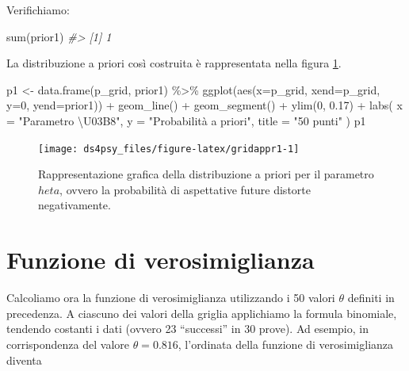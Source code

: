 \documentclass[
  11pt,
]{krantz}
\makeatletter
\newenvironment{Shaded}{\begin{snugshade}}{\end{snugshade}}
\newcommand{\AttributeTok}[1]{\textcolor[rgb]{0.61,0.61,0.61}{#1}}
\newcommand{\CommentTok}[1]{\textcolor[rgb]{0.37,0.37,0.37}{\textit{#1}}}
\newcommand{\DecValTok}[1]{\textcolor[rgb]{0.06,0.06,0.06}{#1}}
\newcommand{\FloatTok}[1]{\textcolor[rgb]{0.06,0.06,0.06}{#1}}
\newcommand{\FunctionTok}[1]{\textcolor[rgb]{0,0,0}{#1}}
\newcommand{\NormalTok}[1]{#1}
\newcommand{\OtherTok}[1]{\textcolor[rgb]{0.37,0.37,0.37}{#1}}
\newcommand{\SpecialCharTok}[1]{\textcolor[rgb]{0,0,0}{#1}}
\newcommand{\StringTok}[1]{\textcolor[rgb]{0.5,0.5,0.5}{#1}}
\newenvironment{kframe}{%
\medskip{}
\setlength{\fboxsep}{.8em}
 \def\at@end@of@kframe{}%
 \ifinner\ifhmode%
  \def\at@end@of@kframe{\end{minipage}}%
  \begin{minipage}{\columnwidth}%
 \fi\fi%
 \def\FrameCommand##1{\hskip\@totalleftmargin \hskip-\fboxsep
 \colorbox{shadecolor}{##1}\hskip-\fboxsep
     \hskip-\linewidth \hskip-\@totalleftmargin \hskip\columnwidth}%
 \MakeFramed {\advance\hsize-\width
   \@totalleftmargin\z@ \linewidth\hsize
   \@setminipage}}%
 {\par\unskip\endMakeFramed%
 \at@end@of@kframe}
\renewenvironment{Shaded}{\begin{kframe}}{\end{kframe}}
\theoremstyle{definition}
\theoremstyle{definition}
\theoremstyle{definition}
\theoremstyle{definition}
\theoremstyle{remark}
\makeatother
\begin{document}
Verifichiamo:

\begin{Shaded}
\begin{Highlighting}[]
\FunctionTok{sum}\NormalTok{(prior1)}
\CommentTok{\#\textgreater{} [1] 1}
\end{Highlighting}
\end{Shaded}

\noindent La distribuzione a priori così costruita è rappresentata nella figura \ref{fig:gridappr1}.

\begin{Shaded}
\begin{Highlighting}[]
\NormalTok{p1 }\OtherTok{\textless{}{-}} \FunctionTok{data.frame}\NormalTok{(p\_grid, prior1) }\SpecialCharTok{\%\textgreater{}\%}
  \FunctionTok{ggplot}\NormalTok{(}\FunctionTok{aes}\NormalTok{(}\AttributeTok{x=}\NormalTok{p\_grid, }\AttributeTok{xend=}\NormalTok{p\_grid, }\AttributeTok{y=}\DecValTok{0}\NormalTok{, }\AttributeTok{yend=}\NormalTok{prior1)) }\SpecialCharTok{+}
  \FunctionTok{geom\_line}\NormalTok{() }\SpecialCharTok{+}
  \FunctionTok{geom\_segment}\NormalTok{() }\SpecialCharTok{+}
  \FunctionTok{ylim}\NormalTok{(}\DecValTok{0}\NormalTok{, }\FloatTok{0.17}\NormalTok{) }\SpecialCharTok{+}
  \FunctionTok{labs}\NormalTok{(}
    \AttributeTok{x =} \StringTok{"Parametro \textbackslash{}U03B8"}\NormalTok{,}
    \AttributeTok{y =} \StringTok{"Probabilità a priori"}\NormalTok{,}
    \AttributeTok{title =} \StringTok{"50 punti"}
\NormalTok{  )}
\NormalTok{p1}
\end{Highlighting}
\end{Shaded}

\begin{figure}[h]

{\centering \texttt{[image: ds4psy\_files/figure-latex/gridappr1-1]} 

}

\caption{Rappresentazione grafica della distribuzione a priori per il parametro $   heta$, ovvero la probabilità di aspettative future distorte negativamente.}\label{fig:gridappr1}
\end{figure}

\hypertarget{funzione-di-verosimiglianza}{%
\section{Funzione di verosimiglianza}\label{funzione-di-verosimiglianza}}

Calcoliamo ora la funzione di verosimiglianza utilizzando i 50 valori \(\theta\) definiti in precedenza. A ciascuno dei valori della griglia applichiamo la formula binomiale, tendendo costanti i dati (ovvero 23 ``successi'' in 30 prove). Ad esempio, in corrispondenza del valore \(\theta = 0.816\), l'ordinata della funzione di verosimiglianza diventa
\end{document}
